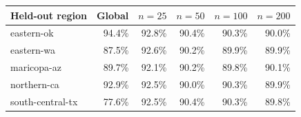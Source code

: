 \begin{tabular}{lrrrrr}\toprule
Held-out region & Global & $n=25$ & $n=50$ & $n=100$ & $n=200$\\\midrule
eastern-ok & 94.4\% & 92.8\% & 90.4\% & 90.3\% & 90.0\%\\
eastern-wa & 87.5\% & 92.6\% & 90.2\% & 89.9\% & 89.9\%\\
maricopa-az & 89.7\% & 92.1\% & 90.2\% & 89.8\% & 90.1\%\\
northern-ca & 92.9\% & 92.5\% & 90.0\% & 90.3\% & 89.9\%\\
south-central-tx & 77.6\% & 92.5\% & 90.4\% & 90.3\% & 89.8\%\\
\bottomrule\end{tabular}
